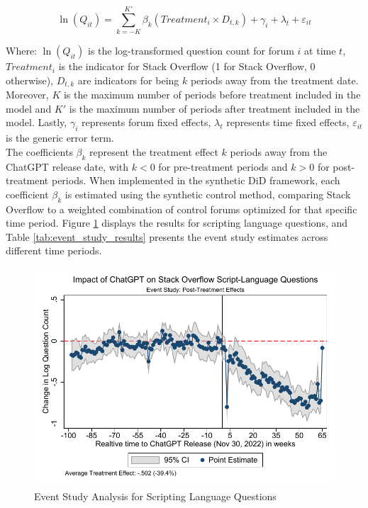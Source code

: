 \begin{equation}
    \ln(Q_{it}) = \sum_{k=-K}^{K'} \beta_k (Treatment_i \times D_{t,k}) + \gamma_i + \lambda_t + \varepsilon_{it}
\end{equation}

Where: $\ln(Q_{it})$ is the log-transformed question count for forum $i$ at time $t$, $Treatment_i$ is the indicator for Stack Overflow (1 for Stack Overflow, 0 otherwise),  $D_{t,k}$ are indicators for being $k$ periods away from the treatment date. Moreover, $K$ is the maximum number of periods before treatment included in the model and $K'$ is the maximum number of periods after treatment included in the model. Lastly, $\gamma_i$ represents forum fixed effects, $\lambda_t$ represents time fixed effects, $\varepsilon_{it}$ is the generic error term.\\

The coefficients $\beta_k$ represent the treatment effect $k$ periods away from the ChatGPT release date, with $k < 0$ for pre-treatment periods and $k > 0$ for post-treatment periods. When implemented in the synthetic DiD framework, each coefficient $\beta_k$ is estimated using the synthetic control method, comparing Stack Overflow to a weighted combination of control forums optimized for that specific time period. Figure \ref{fig:event_study} displays the results for scripting language questions, and Table \ref{tab:event_study_results} presents the event study estimates across different time periods.

\begin{figure}[H]
    \centering
    \includegraphics[width=1\textwidth]{imgs/stata/event_study_scripting_languages.pdf}
    \caption{Event Study Analysis for Scripting Language Questions}
    \label{fig:event_study}
\end{figure}

